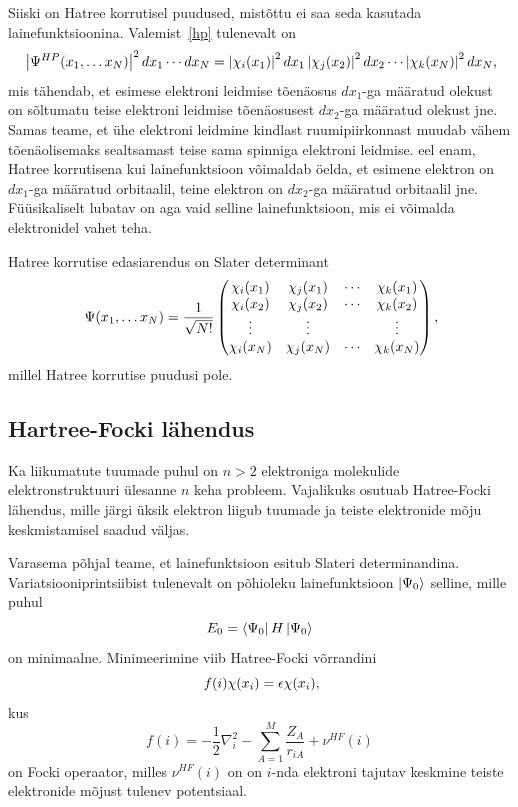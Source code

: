 \documentclass[12pt]{article}
\newcommand{\TODO}{\todo[inline]}
\def\abs#1{\left|#1\right|}
\def\bra#1{\mathinner{\langle#1|}}
\def\ket#1{\mathinner{|#1\rangle}}
\begin{document}
Siiski on Hatree korrutisel puudused, mistõttu ei saa seda kasutada lainefunktsioonina.
Valemist~\eqref{hp} tulenevalt on
\begin{equation}\label{hp}
    \abs{\Psi^{HP}(x_1,\ldots x_N)}^2dx_1\cdots dx_N = \abs{\chi_i(x_1)}^2dx_1\abs{\chi_j(x_2)}^2dx_2\cdots\abs{\chi_k(x_N)}^2dx_N\rlap{,}
\end{equation}
mis tähendab, et esimese elektroni leidmise tõenäosus \(dx_1\)-ga määratud olekust on sõltumatu teise elektroni leidmise tõenäosusest \(dx_2\)-ga määratud olekust jne.
Samas teame, et ühe elektroni leidmine kindlast ruumipiirkonnast muudab vähem tõenäolisemaks sealtsamast teise sama spinniga elektroni leidmise.
eel enam, Hatree korrutisena kui lainefunktsioon võimaldab öelda, et esimene elektron
on \(dx_1\)-ga määratud orbitaalil, teine elektron on \(dx_2\)-ga määratud orbitaalil jne. Füüsikaliselt lubatav on aga vaid selline lainefunktsioon, mis ei võimalda elektronidel vahet teha.

Hatree korrutise edasiarendus on Slater determinant
\begin{equation}
    \Psi(x_1,\ldots x_N) = \frac{1}{\sqrt{N!}}\begin{pmatrix}
        \chi_i(x_1) & \chi_j(x_1) & \cdots & \chi_k(x_1) \\
        \chi_i(x_2) & \chi_j(x_2) & \cdots & \chi_k(x_2) \\
        \vdots & \vdots & & \vdots \\
        \chi_i(x_N) & \chi_j(x_N) & \cdots & \chi_k(x_N) \\
    \end{pmatrix}\rlap{,}
\end{equation}
millel Hatree korrutise puudusi pole.

\subsection{Hartree-Focki lähendus}\label{hatree-fock}

Ka liikumatute tuumade puhul on \(n > 2\) elektroniga molekulide elektronstruktuuri ülesanne \(n\) keha probleem.
Vajalikuks osutuab Hatree-Focki lähendus, mille järgi üksik elektron liigub tuumade ja teiste elektronide mõju keskmistamisel saadud väljas.

\TODO{Siin peaks olema täpsem sõnastus.}

Varasema põhjal teame, et lainefunktsioon esitub Slateri determinandina.
Variatsiooniprintsiibist tulenevalt on põhioleku lainefunktsioon \(\ket{\Psi_0}\) selline, mille puhul
\begin{equation}
    E_0=\bra{\Psi_0}H\ket{\Psi_0}
\end{equation}
on minimaalne.
Minimeerimine viib Hatree-Focki võrrandini
\begin{equation}
    f(i)\chi(x_i)=\epsilon\chi(x_i)\rlap{,}
\end{equation}
kus
\begin{equation}
    f(i) = -\frac{1}{2}\nabla_i^2-\sum_{A=1}^M\frac{Z_A}{r_{iA}}+\nu^{HF}(i)
\end{equation}
on Focki operaator, milles \(\nu^{HF}(i)\) on on \(i\)-nda elektroni tajutav keskmine teiste elektronide mõjust tulenev potentsiaal.
\end{document}
